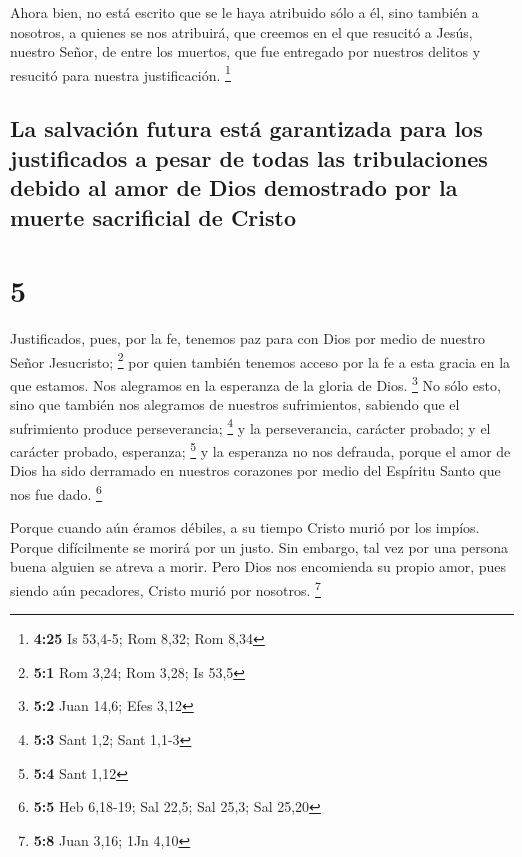  Ahora bien, no está escrito que se le haya atribuido
sólo a él,  sino también a nosotros, a quienes se nos
atribuirá, que creemos en el que resucitó a Jesús, nuestro Señor, de
entre los muertos,  que fue entregado por nuestros
delitos y resucitó para nuestra justificación. \footnote{\textbf{4:25}
  Is 53,4-5; Rom 8,32; Rom 8,34}

\hypertarget{la-salvaciuxf3n-futura-estuxe1-garantizada-para-los-justificados-a-pesar-de-todas-las-tribulaciones-debido-al-amor-de-dios-demostrado-por-la-muerte-sacrificial-de-cristo}{%
\subsection{La salvación futura está garantizada para los justificados a
pesar de todas las tribulaciones debido al amor de Dios demostrado por
la muerte sacrificial de
Cristo}\label{la-salvaciuxf3n-futura-estuxe1-garantizada-para-los-justificados-a-pesar-de-todas-las-tribulaciones-debido-al-amor-de-dios-demostrado-por-la-muerte-sacrificial-de-cristo}}

\hypertarget{section-4}{%
\section{5}\label{section-4}}

 Justificados, pues, por la fe, tenemos paz para con Dios
por medio de nuestro Señor Jesucristo; \footnote{\textbf{5:1} Rom 3,24;
  Rom 3,28; Is 53,5}  por quien también tenemos acceso por
la fe a esta gracia en la que estamos. Nos alegramos en la esperanza de
la gloria de Dios. \footnote{\textbf{5:2} Juan 14,6; Efes 3,12}
 No sólo esto, sino que también nos alegramos de nuestros
sufrimientos, sabiendo que el sufrimiento produce perseverancia;
\footnote{\textbf{5:3} Sant 1,2; Sant 1,1-3}  y la
perseverancia, carácter probado; y el carácter probado, esperanza;
\footnote{\textbf{5:4} Sant 1,12}  y la esperanza no nos
defrauda, porque el amor de Dios ha sido derramado en nuestros corazones
por medio del Espíritu Santo que nos fue dado. \footnote{\textbf{5:5}
  Heb 6,18-19; Sal 22,5; Sal 25,3; Sal 25,20}

 Porque cuando aún éramos débiles, a su tiempo Cristo
murió por los impíos.  Porque difícilmente se morirá por
un justo. Sin embargo, tal vez por una persona buena alguien se atreva a
morir.  Pero Dios nos encomienda su propio amor, pues
siendo aún pecadores, Cristo murió por nosotros. \footnote{\textbf{5:8}
  Juan 3,16; 1Jn 4,10}

